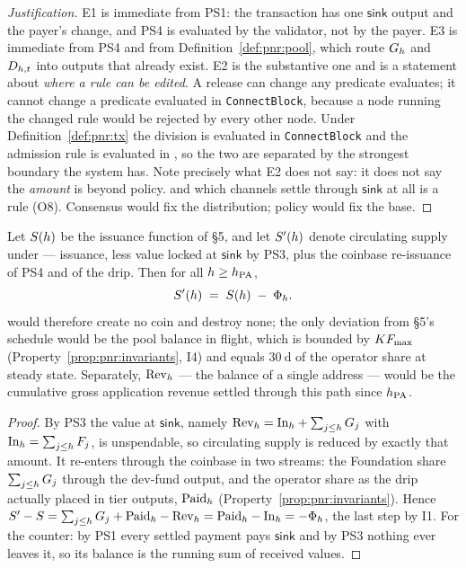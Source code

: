 \begin{proof}[Justification]
E1 is immediate from PS1: the transaction has one $\mathsf{sink}$ output and the payer's change, and
PS4 is evaluated by the validator, not by the payer. E3 is immediate from PS4 and from
Definition~\ref{def:pnr:pool}, which route $G_{h}$ and $D_{h,t}$ into outputs that already
exist. E2 is the substantive one and is a statement about \emph{where a rule can be edited}. A
\FluxOS release can change any predicate \FluxOS evaluates; it cannot change a predicate evaluated
in \texttt{ConnectBlock}, because a node running the changed rule would be rejected by every other
node. Under Definition~\ref{def:pnr:tx} the division is evaluated in \texttt{ConnectBlock} and the
admission rule is evaluated in \FluxOS, so the two are separated by the strongest boundary the
system has. Note precisely what E2 does not say: it does not say the \emph{amount} is beyond policy.
 and which channels settle
through $\mathsf{sink}$ at all is a \FluxOS rule (O8). Consensus would fix the distribution; policy
would fix the base.
\end{proof}

\begin{property}
\label{prop:pnr:supply}
Let $S(h)$ be the issuance function of \S5, and let $S'(h)$ denote circulating
supply under \PNR --- issuance, less value locked at $\mathsf{sink}$ by PS3, plus the coinbase
re-issuance of PS4 and of the drip. Then for all $h \ge h_{\mathrm{PA}}$,
\[
  S'(h) \;=\; S(h) \;-\; \Phi_{h} .
\]
\PNR would therefore create no coin and destroy none; the only deviation from \S5's schedule would
be the pool balance in flight, which is bounded by $K F_{\max}$
(Property~\ref{prop:pnr:invariants}, I4) and equals $\SI{30}{\day}$ of the operator share at steady
state. Separately, $\mathrm{Rev}_{h}$ --- the balance of a single address --- would be the
cumulative gross application revenue settled through this path since $h_{\mathrm{PA}}$.
\end{property}

\begin{proof}
By PS3 the value at $\mathsf{sink}$, namely
$\mathrm{Rev}_{h} = \mathrm{In}_{h} + \sum_{j \le h} G_j$ with
$\mathrm{In}_{h} = \sum_{j \le h}F_j$, is unspendable, so circulating supply is reduced by
exactly that amount. It re-enters through the coinbase in two streams: the Foundation share
$\sum_{j \le h} G_j$ through the dev-fund output, and the operator share as the drip actually
placed in tier outputs, $\mathrm{Paid}_{h}$ (Property~\ref{prop:pnr:invariants}). Hence
$S' - S = \sum_{j \le h}G_j + \mathrm{Paid}_{h} - \mathrm{Rev}_{h}
 = \mathrm{Paid}_{h} - \mathrm{In}_{h} = -\Phi_{h}$, the last step by I1. For the counter: by
PS1 every settled payment pays $\mathsf{sink}$ and by PS3 nothing ever leaves it, so its balance is
the running sum of received values.
\end{proof}

